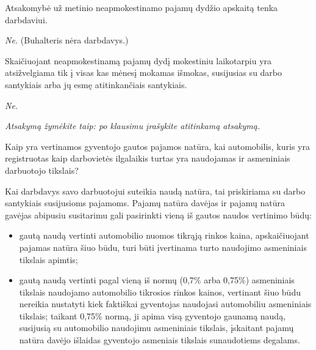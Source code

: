 \begin{tasks}
  \begin{task}
    \begin{condition}
      Atsakomybė už metinio neapmokestinamo pajamų dydžio apskaitą
      tenka darbdaviui.
    \end{condition}
    \begin{solution}
      \emph{Ne.} (Buhalteris nėra darbdavys.)
    \end{solution}
  \end{task}

  \begin{task}
    \begin{condition}
      Skaičiuojant neapmokestinamą pajamų dydį mokestiniu
      laikotarpiu yra atsižvelgiama tik į visas kas mėnesį mokamas
      išmokas, susijusias su darbo santykiais arba jų esmę
      atitinkančiais santykiais.
    \end{condition}
    \begin{solution}
      \emph{Ne.}
    \end{solution}
  \end{task}

  \emph{Atsakymą žymėkite taip: po klausimu įrašykite atitinkamą
  atsakymą.}

  \begin{task}
    \begin{condition}
      Kaip yra vertinamos gyventojo gautos pajamos natūra, kai
      automobilis, kuris yra registruotas kaip darbovietės ilgalaikis
      turtas yra naudojamas ir asmeniniais darbuotojo tikslais?
    \end{condition}
    \begin{solution}
      Kai darbdavys savo darbuotojui suteikia naudą natūra, tai
      priskiriama su darbo santykiais susijusioms pajamoms. Pajamų
      natūra davėjas ir pajamų natūra gavėjas abipusiu susitarimu
      gali pasirinkti vieną iš gautos naudos vertinimo būdų:
      \begin{itemize}
        \item gautą naudą vertinti automobilio nuomos tikrąją rinkos kaina,
          apskaičiuojant pajamas natūra šiuo būdu, turi būti įvertinama
          turto naudojimo asmeniniais tikslais apimtis;
        \item gautą naudą vertinti pagal vieną iš normų (0,7\% arba 0,75\%)
          asmeniniais tikslais naudojamo automobilio tikrosios rinkos
          kainos, vertinant šiuo būdu nereikia nustatyti kiek faktiškai
          gyventojas naudojasi automobiliu asmeniniais tikslais; taikant
          0,75\% normą, ji apima visą gyventojo gaunamą naudą, susijusią
          su automobilio naudojimu asmeniniais tikslais, įskaitant
          pajamų natūra davėjo išlaidas gyventojo asmeniais tikslais
          sunaudotiems degalams.
      \end{itemize}
    \end{solution}
  \end{task}


\end{tasks}
